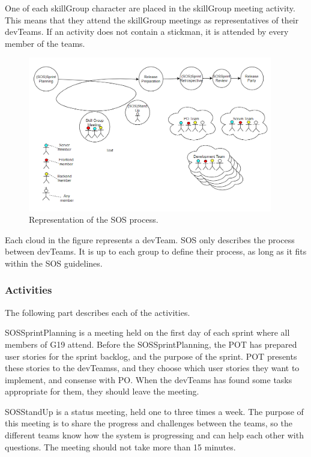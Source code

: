 One of each \gls{skillGroup} character are placed in the \gls{skillGroup} meeting activity. This means that they attend the \gls{skillGroup} meetings as representatives of their \glspl{devTeam}.
If an activity does not contain a stickman, it is attended by every member of the teams.

\begin{figure}[h]
    \begin{center}
        \includegraphics[width=0.95\textwidth]{figures/SOSProcess}
    \end{center}
    \caption{Representation of the \gls{SOS} process.}
    \label{fig:SOSProcess}
\end{figure}

Each cloud in the figure represents a \gls{devTeam}. \gls{SOS} only describes the process between \glspl{devTeam}. It is up to each group to define their process, as long as it fits within the \gls{SOS} guidelines. 

\subsubsection{Activities}
The following part describes each of the activities.

\Gls{SOSSprintPlanning} is a meeting held on the first day of each sprint where all members of \Gls{G19} attend. Before the \Gls{SOSSprintPlanning}, the \gls{POT} has prepared user stories for the sprint backlog, and the purpose of the sprint. \gls{POT} presents these stories to the \glspl{devTeam}s, and they choose which user stories they want to implement, and consense with \gls{PO}. When the \glspl{devTeam} has found some tasks appropriate for them, they should leave the meeting.
 
\Gls{SOSStandUp} is a status meeting, held one to three times a week. The purpose of this meeting is to share the progress and challenges between the teams, so the different teams know how the system is progressing and can help each other with questions. The meeting should not take more than 15 minutes. 

